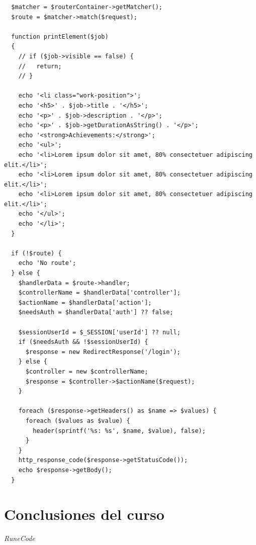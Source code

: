 \documentclass{article}
\begin{document}
\begin{verbatim}
  $matcher = $routerContainer->getMatcher();
  $route = $matcher->match($request);

  function printElement($job)
  {
    // if ($job->visible == false) {
    //   return;
    // }

    echo '<li class="work-position">';
    echo '<h5>' . $job->title . '</h5>';
    echo '<p>' . $job->description . '</p>';
    echo '<p>' . $job->getDurationAsString() . '</p>';
    echo '<strong>Achievements:</strong>';
    echo '<ul>';
    echo '<li>Lorem ipsum dolor sit amet, 80% consectetuer adipiscing elit.</li>';
    echo '<li>Lorem ipsum dolor sit amet, 80% consectetuer adipiscing elit.</li>';
    echo '<li>Lorem ipsum dolor sit amet, 80% consectetuer adipiscing elit.</li>';
    echo '</ul>';
    echo '</li>';
  }

  if (!$route) {
    echo 'No route';
  } else {
    $handlerData = $route->handler;
    $controllerName = $handlerData['controller'];
    $actionName = $handlerData['action'];
    $needsAuth = $handlerData['auth'] ?? false;

    $sessionUserId = $_SESSION['userId'] ?? null;
    if ($needsAuth && !$sessionUserId) {
      $response = new RedirectResponse('/login');
    } else {
      $controller = new $controllerName;
      $response = $controller->$actionName($request);
    }

    foreach ($response->getHeaders() as $name => $values) {
      foreach ($values as $value) {
        header(sprintf('%s: %s', $name, $value), false);
      }
    }
    http_response_code($response->getStatusCode());
    echo $response->getBody();
  }
\end{verbatim}



\section{Conclusiones del curso}%

\vspace{2cm}
\LARGE\textit{RuneCode}
\end{document}
